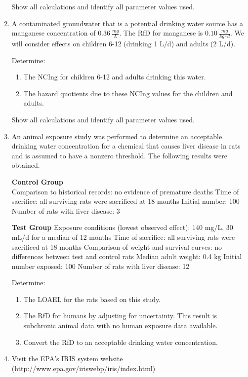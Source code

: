 \documentclass[12pt]{article}
\begin{document}
\begin{enumerate}
Show all calculations and identify all parameter values used. 


\item A contaminated groundwater that is a potential drinking water source has a manganese concentration of $0.36~\frac{mg}{L}$. The RfD for manganese is $0.10~\frac{mg}{kg \cdot d}$. We will consider effects on children 6-12 (drinking 1 L/d) and adults (2 L/d). 

Determine:
\begin{enumerate} %
\item The NCIng for children 6-12 and adults drinking this water.
\item The hazard quotients due to these NCIng values for the children and adults. 
\end{enumerate} %

Show all calculations and identify all parameter values used. 

\clearpage
\item An animal exposure study was performed to determine an acceptable drinking water concentration for a chemical that causes liver disease in rats and is assumed to have a nonzero threshold. The following results were obtained. 

\textbf{Control Group}\\
Comparison to historical records: no evidence of premature deaths 
Time of sacrifice: all surviving rats were sacrificed at 18 months 
Initial number: 100 
Number of rats with liver disease: 3 

\textbf{Test Group}
Exposure conditions (lowest observed effect): 140 mg/L, 30 mL/d for a median of 12 months 
Time of sacrifice: all surviving rats were sacrificed at 18 months 
Comparison of weight and survival curves: no differences between test and control rats 
Median adult weight: 0.4 kg 
Initial number exposed: 100 
Number of rats with liver disease: 12 

Determine:

\begin{enumerate} %
\item The LOAEL for the rats based on this study.
\item The RfD for humans by adjusting for uncertainty. This result is subchronic animal data with no human exposure data available. 
\item Convert the RfD to an acceptable drinking water concentration. 
\end{enumerate} %
\item Visit the EPA’s IRIS system website (http://www.epa.gov/iriswebp/iris/index.html)


\end{enumerate}
\end{document}
